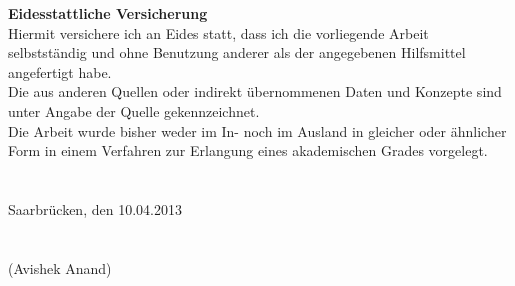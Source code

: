 \documentclass[pdftex, %
a4paper, %
12pt, %
twoside, %
BCOR25mm, %
DIV15, %
titlepage, %
openright, %
headsepline, %
bigheadings, %
chapterprefix, %
mpexclude, %
bibtotoc, %
idxtotoc, %
liststotoc, %
cleardoublestandard, %
citecolor=black, %
eulerchapternumbers,
]{scrbook}
\begin{document}
\begin{titlepage}
  

  \noindent \textbf{Eidesstattliche Versicherung}\\

  \noindent Hiermit versichere ich an Eides statt, dass ich die
  vorliegende Arbeit selbst\-st\"andig und ohne Benutzung anderer als
  der angegebenen
  Hilfsmittel angefertigt habe.\\

  \noindent Die aus anderen Quellen oder indirekt \"ubernommenen Daten
  und
  Konzepte sind unter Angabe der Quelle gekennzeichnet.\\

  \noindent Die Arbeit wurde bisher weder im In- noch im Ausland in
  gleicher oder \"ahn\-lich\-er Form in einem Verfahren zur Erlangung
  eines akademischen
  Grades vorgelegt.\\\\\\


  \noindent Saarbr\"ucken, den 10.04.2013\\\\\\


  \noindent (Avishek Anand)

\end{titlepage}
\end{document}
